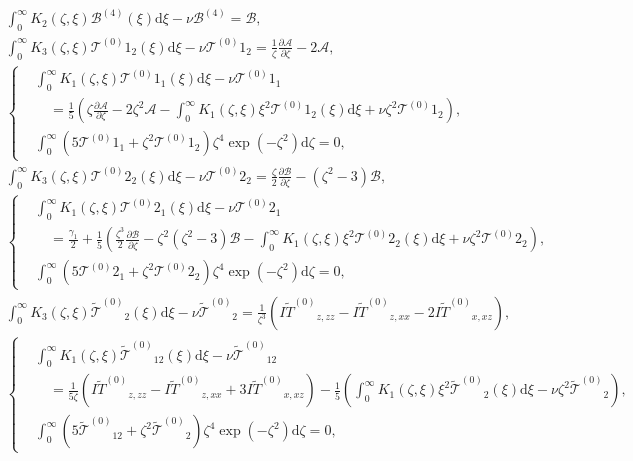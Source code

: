 \documentclass[a4paper,12pt]{article}
\newcommand{\dd}{\mathrm{d}}
\newcommand{\pder}[2][]{\frac{\partial#1}{\partial#2}}
\newcommand{\B}{\ensuremath{\mathcal{B}^{(4)}}}
\newcommand{\T}[1][0]{\ensuremath{\mathcal{T}^{(#1)}}}
\newcommand{\TT}{\ensuremath{\tilde{\mathcal{T}}^{(0)}}}
\newcommand{\IFF}[1]{\ensuremath{I\tilde{#1}^{(0)}}}
\begin{document}
\begin{gather}
    \int_0^\infty K_2(\zeta,\xi)\B(\xi)\dd\xi - \nu\B = \mathcal{B}, \\
    \int_0^\infty K_3(\zeta,\xi)\T{1}_2(\xi)\dd\xi - \nu\T{1}_2
        = \frac1\zeta\pder[\mathcal{A}]{\zeta} - 2\mathcal{A}, \\
    \left\{\begin{aligned}
    &\int_0^\infty K_1(\zeta,\xi)\T{1}_1(\xi)\dd\xi - \nu\T{1}_1 \\
        &\quad = \frac15\left( \zeta\pder[\mathcal{A}]{\zeta} - 2\zeta^2\mathcal{A}
        - \int_0^\infty K_1(\zeta,\xi)\xi^2\T{1}_2(\xi)\dd\xi
        + \nu\zeta^2\T{1}_2 \right), \\
    &\int_0^\infty \left( 5\T{1}_1 + \zeta^2\T{1}_2 \right) \zeta^4 \exp(-\zeta^2)\dd\zeta = 0,
    \end{aligned}\right.\\
    \int_0^\infty K_3(\zeta,\xi)\T{2}_2(\xi)\dd\xi - \nu\T{2}_2
        = \frac\zeta2\pder[\mathcal{B}]{\zeta} - \left(\zeta^2-3\right)\mathcal{B}, \\
    \left\{\begin{aligned}
    &\int_0^\infty K_1(\zeta,\xi)\T{2}_1(\xi)\dd\xi - \nu\T{2}_1 \\
        &\quad = \frac{\gamma_1}2 + \frac15\left( \frac{\zeta^3}2\pder[\mathcal{B}]{\zeta}
        - \zeta^2\left(\zeta^2-3\right)\mathcal{B}
        - \int_0^\infty K_1(\zeta,\xi)\xi^2\T{2}_2(\xi)\dd\xi
        + \nu\zeta^2\T{2}_2 \right), \\
    &\int_0^\infty \left( 5\T{2}_1 + \zeta^2\T{2}_2 \right) \zeta^4 \exp(-\zeta^2)\dd\zeta = 0,
    \end{aligned}\right.\\
    \int_0^\infty K_3(\zeta,\xi)\TT_2(\xi)\dd\xi - \nu\TT_2
        = \frac1{\zeta^3}\left(\IFF{T}_{z,zz} - \IFF{T}_{z,xx} - 2\IFF{T}_{x,xz}\right), \\
    \left\{\begin{aligned}
    &\int_0^\infty K_1(\zeta,\xi)\TT_{12}(\xi)\dd\xi - \nu\TT_{12} \\
        &\quad = \frac1{5\zeta}\left(\IFF{T}_{z,zz} - \IFF{T}_{z,xx} + 3\IFF{T}_{x,xz}\right)
        - \frac15\left(\int_0^\infty K_1(\zeta,\xi)\xi^2\TT_2(\xi)\dd\xi
        - \nu\zeta^2\TT_2 \right), \\
    &\int_0^\infty \left( 5\TT_{12} + \zeta^2\TT_2 \right) \zeta^4 \exp(-\zeta^2)\dd\zeta = 0,
    \end{aligned}\right.\\

\end{gather}
\end{document}
